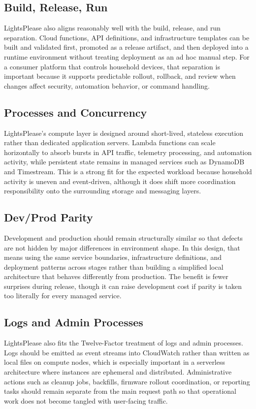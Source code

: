 \subsection{Build, Release, Run}

LightsPlease also aligns reasonably well with the build, release, and run separation. Cloud functions, API definitions, and infrastructure templates can be built and validated first, promoted as a release artifact, and then deployed into a runtime environment without treating deployment as an ad hoc manual step. For a consumer platform that controls household devices, that separation is important because it supports predictable rollout, rollback, and review when changes affect security, automation behavior, or command handling.

\subsection{Processes and Concurrency}

LightsPlease's compute layer is designed around short-lived, stateless execution rather than dedicated application servers. Lambda functions can scale horizontally to absorb bursts in API traffic, telemetry processing, and automation activity, while persistent state remains in managed services such as DynamoDB and Timestream. This is a strong fit for the expected workload because household activity is uneven and event-driven, although it does shift more coordination responsibility onto the surrounding storage and messaging layers.

\subsection{Dev/Prod Parity}

Development and production should remain structurally similar so that defects are not hidden by major differences in environment shape. In this design, that means using the same service boundaries, infrastructure definitions, and deployment patterns across stages rather than building a simplified local architecture that behaves differently from production. The benefit is fewer surprises during release, though it can raise development cost if parity is taken too literally for every managed service.

\subsection{Logs and Admin Processes}

LightsPlease also fits the Twelve-Factor treatment of logs and admin processes. Logs should be emitted as event streams into CloudWatch rather than written as local files on compute nodes, which is especially important in a serverless architecture where instances are ephemeral and distributed. Administrative actions such as cleanup jobs, backfills, firmware rollout coordination, or reporting tasks should remain separate from the main request path so that operational work does not become tangled with user-facing traffic.
